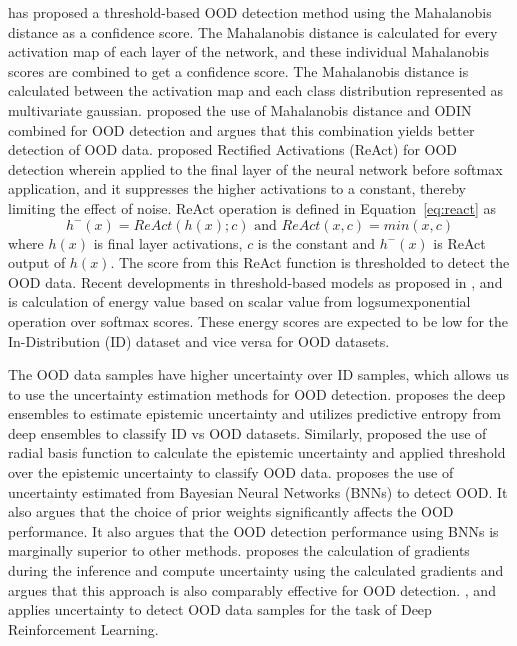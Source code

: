     \cite{lee2018simple_mahalanobis} has proposed a threshold-based OOD detection method using the Mahalanobis distance as a confidence score.
    The Mahalanobis distance is calculated for every activation map of each layer of the network, and these individual Mahalanobis scores are combined to get a confidence score.
    The Mahalanobis distance is calculated between the activation map and each class distribution represented as multivariate gaussian.
    \cite{Maha_plus_ODIN} proposed the use of Mahalanobis distance and ODIN combined for OOD detection and argues that this combination yields better detection of OOD data.
    \cite{ReAct} proposed Rectified Activations (ReAct) for OOD detection wherein applied to the final layer of the neural network before softmax application, and it suppresses the higher activations to a constant, thereby limiting the effect of noise. 
    ReAct operation is defined in Equation~\ref{eq:react} as
    \begin{equation}
        h^{-}(x) = ReAct(h(x); c) \text{ and } ReAct(x, c) = min(x, c) \label{eq:react}
    \end{equation} 
    where $h(x)$ is final layer activations, $c$ is the constant and $h^{-}(x)$ is ReAct output of $h(x)$.
    The score from this ReAct function is thresholded to detect the OOD data. 
    Recent developments in threshold-based models as proposed in \cite{Energy_OOD_1}, and \cite{Energy_OOD_2} is calculation of energy value based on scalar value from logsumexponential operation over softmax scores.
    These energy scores are expected to be low for the In-Distribution (ID) dataset and vice versa for OOD datasets.

    The OOD data samples have higher uncertainty over ID samples, which allows us to use the uncertainty estimation methods for OOD detection.
    \cite{lakshminarayanan2016simple} proposes the deep ensembles to estimate epistemic uncertainty and utilizes predictive entropy from deep ensembles to classify ID vs OOD datasets.
    Similarly, \cite{JAmersfoot_RBF} proposed the use of radial basis function to calculate the epistemic uncertainty and applied threshold over the epistemic uncertainty to classify OOD data.
    \cite{UOOD_BNN} proposes the use of uncertainty estimated from Bayesian Neural Networks (BNNs) to detect OOD.
    It also argues that the choice of prior weights significantly affects the OOD performance.
    It also argues that the OOD detection performance using BNNs is marginally superior to other methods.
    \cite{Grad_UOOD} proposes the calculation of gradients during the inference and compute uncertainty using the calculated gradients and argues that this approach is also comparably effective for OOD detection.
    \cite{UOOD_RL1}, and \cite{UOOD_RL2} applies uncertainty to detect OOD data samples for the task of Deep Reinforcement Learning.
    
